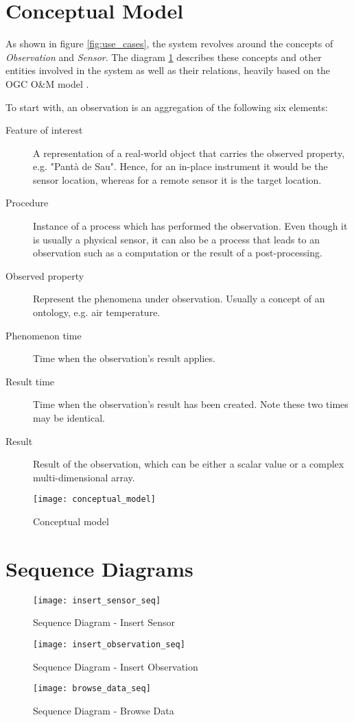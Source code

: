 \section{Conceptual Model}

As shown in figure \ref{fig:use_cases}, the system revolves around the concepts of \textit{Observation} and \textit{Sensor}. The diagram \ref{fig:conceptual_model} describes these concepts and other entities involved in the system as well as their relations, heavily based on the OGC O\&M model \cite{OM}.

To start with, an observation is an aggregation of the following six elements:

\begin{description}
\item[Feature of interest] A representation of a real-world object that carries the observed property, e.g. "Pant\`a de Sau". Hence, for an in-place instrument it would be the sensor location, whereas for a remote sensor it is the target location.
\item[Procedure] Instance of a process which has performed the observation. Even though it is usually a physical sensor, it can also be a process that leads to an observation such as a computation or the result of a post-processing.
\item[Observed property] Represent the phenomena under observation. Usually a concept of an ontology, e.g. air temperature.
\item[Phenomenon time] Time when the observation's result applies.
\item[Result time] Time when the observation's result has been created. Note these two times may be identical.
\item[Result] Result of the observation, which can be either a scalar value or a complex multi-dimensional array.
\end{description}

\begin{figure}[ht]
	\centering
	\texttt{[image: conceptual\_model]}
	\caption{Conceptual model}
	\label{fig:conceptual_model}
\end{figure}
\newpage

\section{Sequence Diagrams}

\begin{figure}[ht]
	\centering
	\texttt{[image: insert\_sensor\_seq]}
	\caption{Sequence Diagram - Insert Sensor}
	\label{fig:insert_sensor_seq}
\end{figure}

\begin{figure}[ht]
	\centering
	\texttt{[image: insert\_observation\_seq]}
	\caption{Sequence Diagram - Insert Observation}
	\label{fig:insert_observation_seq}
\end{figure}

\begin{figure}[ht]
	\centering
	\texttt{[image: browse\_data\_seq]}
	\caption{Sequence Diagram - Browse Data}
	\label{fig:browse_data_seq}
\end{figure}

